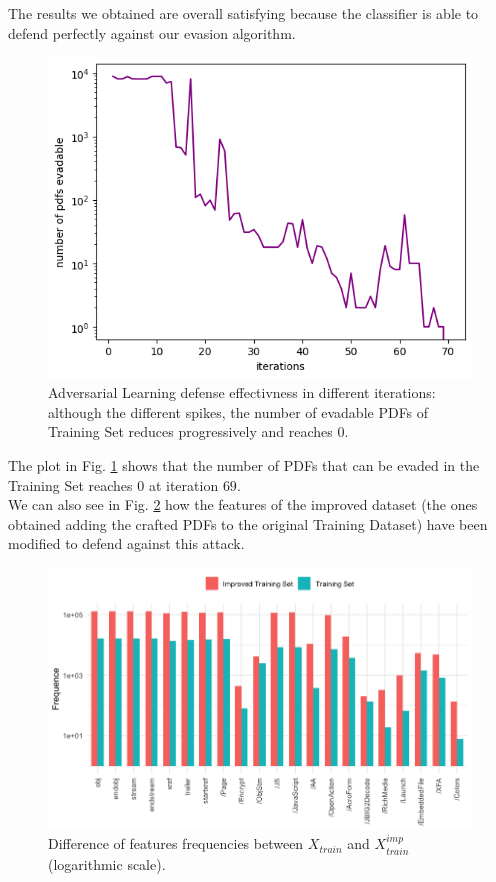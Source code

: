 \documentclass[twocolumn, switch]{article} %
\newcommand\x{0.7}
\begin{document}
The results we obtained are overall satisfying because the classifier is able to defend perfectly against our evasion algorithm.

\begin{figure}[ht!]
	\centering
	\includegraphics[width=\x\linewidth]{adv_learning.png}
	\caption{Adversarial Learning defense effectivness in different iterations: although the different spikes, the number of evadable PDFs of Training Set reduces progressively and reaches $0$.}
	\label{fig:advlearn}
\end{figure}
The plot in Fig. \ref{fig:advlearn} shows that the number of PDFs that can be evaded in the Training Set reaches $0$ at iteration $69$.\\
We can also see in Fig. \ref{fig:improved} how the features of the improved dataset (the ones obtained adding the crafted PDFs to the original Training Dataset) have been modified to defend against this attack.

\begin{figure}[ht!]
	\centering
	\includegraphics[width=\x\linewidth]{hist_train_improved.png}
	\caption{Difference of features frequencies between $X_{train}$ and $X_{train}^{imp}$ (logarithmic scale).}
	\label{fig:improved}
\end{figure}
\end{document}
